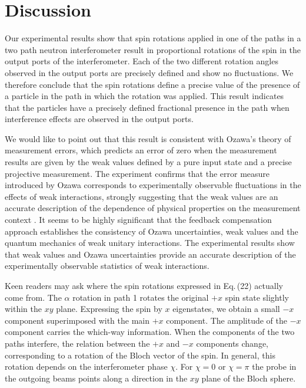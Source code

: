 \documentclass[english,keywords,aps,twocolumn]{revtex4-1}
\begin{document}
\section{Discussion} \label{sec:discussion}


Our experimental results show that spin rotations applied in one of the paths in a two path neutron interferometer result in proportional rotations of the spin in the output ports of the interferometer. Each of the two different rotation angles observed in the output ports are precisely defined and show no fluctuations. We therefore conclude that the spin rotations define a precise value of the presence of a particle in the path in which the rotation was applied. This result indicates that the particles have a precisely defined fractional presence in the path when interference effects are observed in the output ports. 

We would like to point out that this result is consistent with Ozawa's theory of measurement errors, which predicts an error of zero when the measurement results are given by the weak values defined by a pure input state and a precise projective measurement. The experiment confirms that the error measure introduced by Ozawa corresponds to experimentally observable fluctuations in the effects of weak interactions, strongly suggesting that the weak values are an accurate description of the dependence of physical properties on the measurement context \cite{Tollaksen07}. It seems to be highly significant that the feedback compensation approach establishes the consistency of Ozawa uncertainties, weak values and the quantum mechanics of weak unitary interactions. The experimental results show that weak values and Ozawa uncertainties provide an accurate description of the experimentally observable statistics of weak interactions.

Keen readers may ask where the spin rotations expressed in Eq.\,(22) actually come from. The $\alpha$ rotation in path 1 rotates the original $+x$ spin state slightly within the $xy$ plane. Expressing the spin by $x$ eigenstates, we obtain a small $-x$ component superimposed with the main $+x$ component. The amplitude of the $-x$ component carries the which-way information. When the components of the two paths interfere, the relation between the $+x$ and $-x$ components change, corresponding to a rotation of the Bloch vector of the spin. In general, this rotation depends on the interferometer phase $\chi$. For $\chi=0$ or $\chi=\pi$ the probe in the outgoing beams points along a direction in the $xy$ plane of the Bloch sphere.
\end{document}
